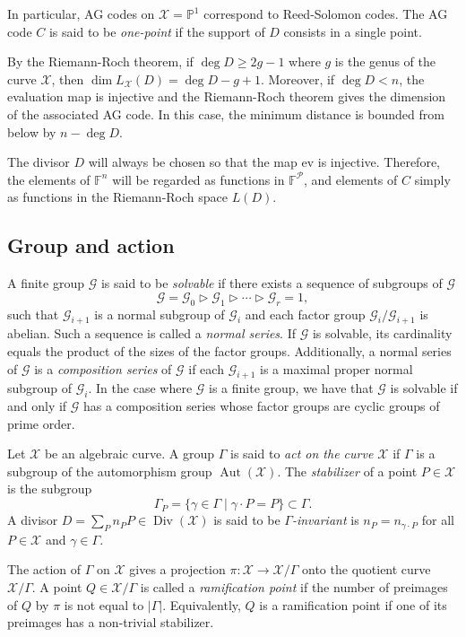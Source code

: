 \documentclass[a4paper,USenglish,autoref]{lipics-v2021}
\newcommand\F{\mathbb{F}}
\newcommand\PP{\mathbb{P}}
\DeclareMathOperator{\Aut}{Aut}
\DeclareMathOperator{\Div}{Div}
\newcommand{\size}[1]{\left|#1\right|}
\newcommand\calX{\mathcal{X}}
\newcommand\calP{\mathcal{P}}
\newcommand\calG{\mathcal{G}}
\begin{document}
In particular, AG codes on $\calX = \PP^1$ correspond to Reed-Solomon codes. 
The AG code $C$ is said to be \emph{one-point} if the support of $D$ consists in a single point.

By the {Riemann-Roch} theorem, if $\deg D \geq 2g-1$ where $g$ is the genus of the curve $\calX$, then $\dim L_\calX(D)=\deg D -g +1$. Moreover, if $\deg D< n$, the evaluation map is injective and the {Riemann-Roch} theorem gives the dimension of the associated AG code. In this case, the minimum distance is bounded from below by $n - \deg D$.

The divisor $D$ will always be chosen so that the map $\text{ev}$ is injective. Therefore, the elements of $\F^n$ will be regarded as functions in $\F^\calP$, and elements of $C$ simply as functions in the {Riemann-Roch} space $L(D)$.

\subsection{Group and action}
A finite group $\calG$  is said to be \emph{solvable} if  there exists a sequence of subgroups of $\calG$ 
\[\calG=\calG_0 \vartriangleright \calG_1 \vartriangleright \cdots \vartriangleright \calG_r = 1, \] 
such that $\calG_{i+1}$ is a normal subgroup of $\calG_i$ and each factor group $\calG_i / \calG_{i+1}$ is abelian. Such a sequence is called a \emph{normal series}. If $\calG$ is solvable, its cardinality equals the product of the sizes of the factor groups. 
Additionally, a normal series of $\calG$ is a \emph{composition series} of $\calG$ if each $\calG_{i+1}$ is a maximal proper normal subgroup of $\calG_{i}$. In the case where $\calG$ is a finite group, we have that $\calG$ is solvable if and only if $\calG$ has a composition series whose factor groups are cyclic groups of prime order.

Let $\calX$ be an algebraic curve. A group $\Gamma$ is said to \emph{act on the curve $\calX$} if $\Gamma$ is a subgroup of the automorphism group $\Aut(\calX)$. The \emph{stabilizer} of a point $P \in \calX$ is the subgroup \[\Gamma_P=\{\gamma \in \Gamma \mid \gamma\cdot P = P\} \subset \Gamma.\] 
A divisor $D=\sum_P n_P P \in \Div(\calX)$ is said to be \emph{$\Gamma$-invariant} is $n_P=n_{\gamma\cdot P}$ for all $P\in \calX$ and $\gamma \in \Gamma$.

The action of $\Gamma$ on $\calX$ gives a projection $\pi: \calX \rightarrow \calX/\Gamma$ onto the quotient curve $\calX/\Gamma$. A point $Q \in \calX/\Gamma$ is called a \emph{ramification point} if the number of preimages of $Q$ by $\pi$ is not equal to $\size{\Gamma}$. Equivalently, $Q$ is a ramification point if one of its preimages has a non-trivial stabilizer. 
\end{document}
